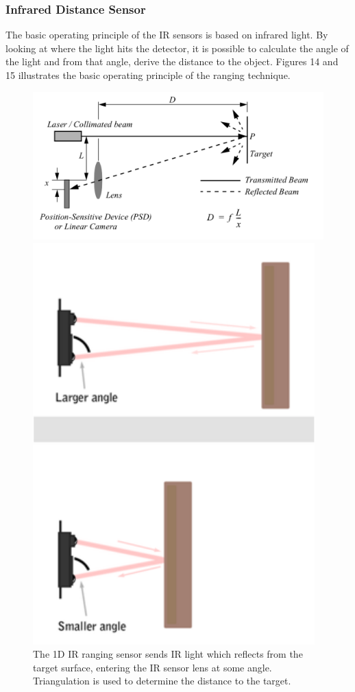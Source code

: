 \documentclass[a4paper]{article}
\begin{document}
\subsubsection{Infrared Distance Sensor}
The basic operating principle of the IR sensors is based on infrared light. By looking at where the light hits the detector, it is possible to calculate the angle of the light and from that angle, derive the distance to the object. Figures 14 and 15 illustrates the basic operating principle of the ranging technique.
\begin{figure}[h]
\centering
\begin{minipage}[t]{0.45\textwidth}
\centering
\includegraphics[scale=0.25]{1d_IR_triang}
\caption{The 1D IR ranging sensor sends IR light which reflects from the target surface, entering the IR sensor lens at some angle. Triangulation is used to determine the distance to the target.}
\end{minipage}
\hspace{1cm}
\begin{minipage}[t]{0.45\textwidth}
\centering
\includegraphics[scale=0.25]{1d_IR_example}

\end{minipage}
\end{figure}
\end{document}
